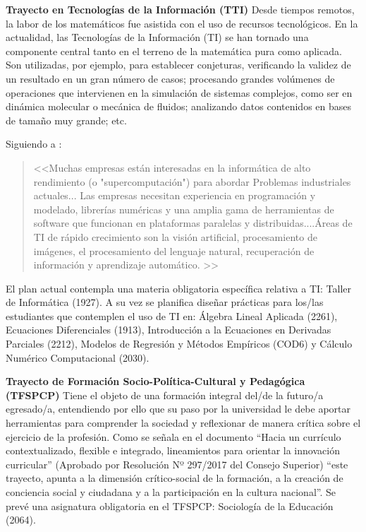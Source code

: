 \documentclass[a4paper, 12pt]{article}
\begin{document}
\begin{description}
\item{\textbf{Trayecto en Tecnologías de la Información (TTI)}}  Desde tiempos remotos, la labor de los matemáticos fue asistida con el uso de  recursos tecnológicos. En la actualidad,  las Tecnologías de la Información (TI) se han tornado una componente central tanto en el terreno de la matemática pura como aplicada. Son utilizadas, por ejemplo, para establecer conjeturas, verificando la validez de un resultado en un gran número de casos; procesando grandes volúmenes de operaciones que intervienen en la simulación de sistemas complejos, como ser en dinámica molecular o mecánica de fluidos; analizando datos contenidos en bases de tamaño muy grande; etc. 

Siguiendo a \cite{society2012siam}: 
\begin{quote}
<<Muchas empresas están interesadas en la informática de alto rendimiento (o "supercomputación") para abordar 
Problemas industriales actuales... Las empresas necesitan experiencia en programación y modelado, librerías numéricas
 y una amplia gama de herramientas de software que funcionan en plataformas paralelas y distribuidas....Áreas de TI de rápido crecimiento son la visión artificial, procesamiento de imágenes, el procesamiento del lenguaje natural, recuperación de información y aprendizaje automático. >>
\end{quote}

El plan actual contempla una materia obligatoria específica  relativa a TI: Taller de Informática (1927).  A su vez se planifica diseñar prácticas para los/las estudiantes que contemplen el uso de TI en:  Álgebra Lineal Aplicada (2261), Ecuaciones Diferenciales (1913), Introducción a la Ecuaciones en Derivadas Parciales (2212), Modelos de Regresión y Métodos Empíricos (COD6) y Cálculo Numérico Computacional (2030). 


\item{\textbf{Trayecto de Formación Socio-Política-Cultural y Pedagógica (TFSPCP)}}  Tiene el objeto de una formación integral del/de la futuro/a egresado/a,  entendiendo por ello que su paso por la universidad le debe aportar herramientas para comprender la sociedad y reflexionar de manera crítica sobre el ejercicio de la profesión. Como se señala en el documento  ``Hacia un currículo contextualizado, 
flexible e integrado, lineamientos para orientar la innovación curricular'' (Aprobado por Resolución Nº 297/2017 del Consejo Superior) ``este trayecto, apunta a la dimensión crítico-social de la formación, a la creación de conciencia social y ciudadana y a la participación en la cultura nacional''. Se prevé una asignatura obligatoria en el   TFSPCP:  Sociología de la Educación (2064).







\end{description}
\end{document}
